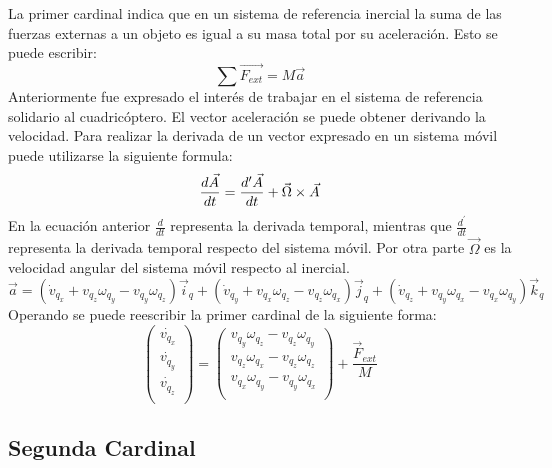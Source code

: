 \documentclass[main]{subfiles}
\begin{document}
La primer cardinal indica que en un sistema de referencia inercial la suma de las fuerzas externas a un objeto es igual a su masa total por su aceleraci\'on. Esto se puede escribir:
\begin{equation}
\sum \vec{F_{ext}} = M\vec{a}
\end{equation}
Anteriormente fue expresado el inter\'es de trabajar en el sistema de referencia solidario al cuadric\'optero. 
El vector aceleraci\'on se puede obtener derivando la velocidad. Para realizar la derivada de un vector expresado en un sistema m\'ovil puede utilizarse la siguiente formula:
\begin{equation}
\frac{d\vec{A}}{dt} =\frac{d^\prime\vec{A}}{dt}+\vec{\Omega}\times\vec{A} \\
\end{equation}
En la ecuaci\'on anterior $\frac{d}{dt}$ representa la derivada temporal, mientras que $\frac{d^\prime}{dt}$ representa la derivada temporal respecto del sistema m\'ovil. Por otra parte $\vec{\Omega}$ es la velocidad angular del sistema m\'ovil respecto al inercial. 
\begin{equation}
\vec{a} = (\dot{v}_{q_x}+v_{q_z} \omega_{q_y} - v_{q_y} \omega_{q_z} )\vec{i}_q + (\dot{v}_{q_y}+v_{q_x} \omega_{q_z} - v_{q_z} \omega_{q_x} )\vec{j}_q+(\dot{v}_{q_z}+v_{q_y} \omega_{q_x} - v_{q_x} \omega_{q_y} )\vec{k}_q
\end{equation}
Operando se puede reescribir la primer cardinal de la siguiente forma:
\begin{equation}
\left(\begin{array}{c}\dot{v_{q_x}}\\
\dot{v_{q_y}}\\
\dot{v_{q_z}}\\
\end{array} \right) = \left(\begin{array}{c}
v_{q_y} \omega_{q_z} - v_{q_z} \omega_{q_y}	\\
v_{q_z} \omega_{q_x} - v_{q_z} \omega_{q_z}\\
v_{q_x} \omega_{q_y} - v_{q_y} \omega_{q_x}\\
\end{array}\right) + \frac{\vec{F}_{ext} }{M}
\label{eq:vpuntos}
\end{equation}

\subsection{Segunda Cardinal}
\end{document}

